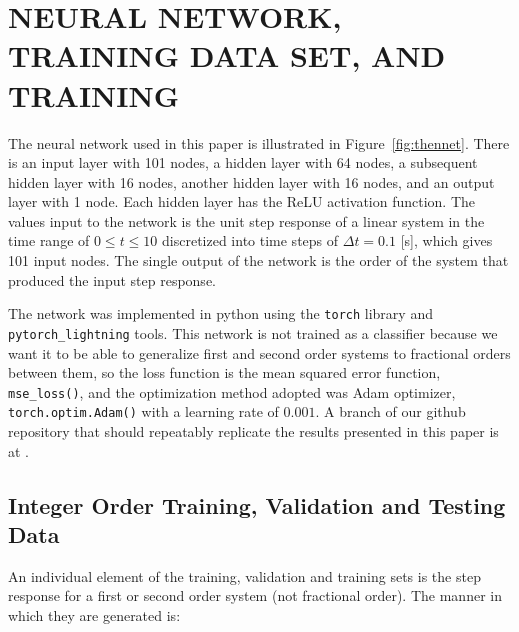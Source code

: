 \section{NEURAL NETWORK, TRAINING DATA SET, AND TRAINING}
\label{sec:network}

  The neural network used in this paper is illustrated in
  Figure~\ref{fig:thennet}. There is an input layer with 101 nodes, a hidden
  layer with 64 nodes, a subsequent hidden layer with 16 nodes, another hidden
  layer with 16 nodes, and an output layer with 1 node. Each hidden layer has
  the ReLU activation function. The values input to the network is the unit step
  response of a linear system in the time range of $0 \leq t \leq 10$
  discretized into time steps of $\Delta t = 0.1$ [s], which gives 101 input
  nodes. The single output of the network is the order of the system that
  produced the input step response. 

The network was implemented in python using the \texttt{torch} library and
  \texttt{pytorch\_lightning} tools. This network is not trained as a classifier
  because we want it to be able to generalize first and second order systems to
  fractional orders between them, so the loss function is the mean squared error
  function, \texttt{mse\_loss()}, and the optimization method adopted was Adam
  optimizer, \texttt{torch.optim.Adam()} with a learning rate of $0.001$. A
  branch of our github repository that should repeatably replicate the results
  presented in this paper is at \cite{Goodwine_Integer_trained_neural}.

\subsection{Integer Order Training, Validation and Testing Data}

  An individual element of the training, validation and training sets is the
  step response for a first or second order system (not fractional order). The
  manner in which they are generated is:

